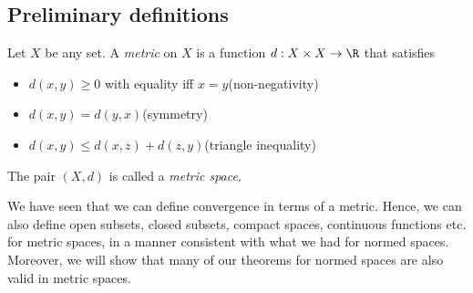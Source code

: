 \documentclass[a4paper]{article}
\begin{document}
\subsection{Preliminary definitions}
\begin{defi}
  Let $X$ be any set. A \emph{metric} on $X$ is a function $d: X\times X \to \R$ that satisfies
  \begin{itemize}
    \item $d(x, y) \geq 0$ with equality iff $x = y$\hfill(non-negativity)
    \item $d(x, y) = d(y, x)$\hfill(symmetry)
    \item $d(x, y) \leq d(x, z) + d(z, y)$\hfill(triangle inequality)
  \end{itemize}
  The pair $(X, d)$ is called a \emph{metric space}.
\end{defi}
We have seen that we can define convergence in terms of a metric. Hence, we can also define open subsets, closed subsets, compact spaces, continuous functions etc. for metric spaces, in a manner consistent with what we had for normed spaces. Moreover, we will show that many of our theorems for normed spaces are also valid in metric spaces.
\end{document}
